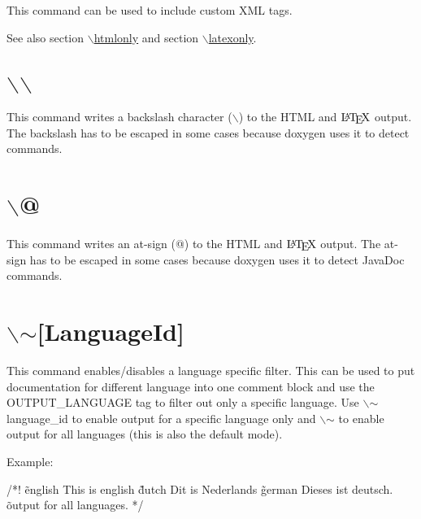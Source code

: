 This command can be used to include custom XML tags.

\begin{DoxySeeAlso}{See also}
section \hyperlink{commands_cmdhtmlonly}{$\backslash$htmlonly} and section \hyperlink{commands_cmdlatexonly}{$\backslash$latexonly}.
\end{DoxySeeAlso}


 \hypertarget{commands_cmdbackslash}{}\section{$\backslash$$\backslash$}\label{commands_cmdbackslash}
\index{\\@{$\backslash$$\backslash$}} This command writes a backslash character ($\backslash$) to the HTML and $\mbox{\LaTeX}$ output. The backslash has to be escaped in some cases because doxygen uses it to detect commands.



 \hypertarget{commands_cmdat}{}\section{$\backslash$@}\label{commands_cmdat}
 This command writes an at-\/sign (@) to the HTML and $\mbox{\LaTeX}$ output. The at-\/sign has to be escaped in some cases because doxygen uses it to detect JavaDoc commands.



 \hypertarget{commands_cmdtilde}{}\section{$\backslash$$\sim$\mbox{[}LanguageId\mbox{]}}\label{commands_cmdtilde}
 This command enables/disables a language specific filter. This can be used to put documentation for different language into one comment block and use the {\ttfamily OUTPUT\_\-LANGUAGE} tag to filter out only a specific language. Use $\backslash$$\sim$language\_\-id to enable output for a specific language only and $\backslash$$\sim$ to enable output for all languages (this is also the default mode).

Example: \begin{DoxyVerb}
/*! \~english This is english \~dutch Dit is Nederlands \~german Dieses ist
    deutsch. \~ output for all languages.
 */
\end{DoxyVerb}





